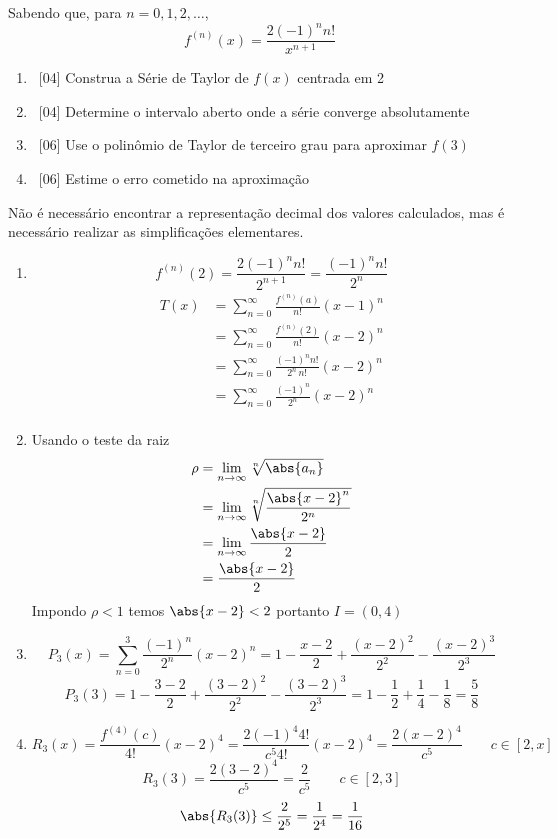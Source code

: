 \documentclass[a4paper,12pt,fleqn]{article}
\begin{document}
Sabendo que, para \(n=0, 1, 2, \dots\),
\[
  f^{(n)}(x) = \frac{2(-1)^n n!}{x^{n+1}}
\]
\begin{enumerate}[label=\alph*)]
  \item\ [04] Construa a Série de Taylor de $f(x)$ centrada em 2
  \item\ [04] Determine o intervalo aberto onde a série converge absolutamente
  \item\ [06] Use o polinômio de Taylor de terceiro grau para aproximar \(f(3)\)
  \item\ [06] Estime o erro cometido na aproximação
\end{enumerate}
Não é necessário encontrar a representação decimal dos valores calculados,
mas é necessário realizar as simplificações elementares.

\begin{answer}
\begin{enumerate}[label=\alph*)]
\item
  \[
    f^{(n)}(2)
    = \frac{2(-1)^n n!}{2^{n+1}}
    = \frac{(-1)^n n!}{2^n}
  \]
  \begin{align*}
    T(x)
    & = \sum_{n=0}^{\infty} \frac{f^{(n)}(a)}{n!}(x-1)^n \\
    & = \sum_{n=0}^{\infty} \frac{f^{(n)}(2)}{n!}(x-2)^n \\
    & = \sum_{n=0}^{\infty} \frac{(-1)^n n!}{2^n\,n!}(x-2)^n \\
    & = \sum_{n=0}^{\infty} \frac{(-1)^n}{2^n}(x-2)^n \\
  \end{align*}

\item
  Usando o teste da raiz
  \begin{align*}
    \rho
    & = \lim_{n\to\infty} \sqrt[n]{\abs{a_n}} \\
    & = \lim_{n\to\infty} \sqrt[n]{\frac{\abs{x-2}^n}{2^n}} \\
    & = \lim_{n\to\infty} \frac{\abs{x-2}}{2} \\
    & = \frac{\abs{x-2}}{2} \\
  \end{align*}
  Impondo \(\rho<1\) temos \(\abs{x-2}<2\) portanto \(I=(0, 4)\)

\item
  \[
    P_3(x)
    = \sum_{n=0}^{3} \frac{(-1)^n}{2^n}(x-2)^n
    = 1 - \frac{x-2}{2} + \frac{(x-2)^2}{2^2} - \frac{(x-2)^3}{2^3}
  \]
  \[
    P_3(3)
    = 1 - \frac{3-2}{2} + \frac{(3-2)^2}{2^2} - \frac{(3-2)^3}{2^3}
    = 1 - \frac{1}{2} + \frac{1}{4} - \frac{1}{8}
    = \frac{5}{8}
  \]

\item
  \[
    R_3(x)
    = \frac{f^{(4)}(c)}{4!}(x-2)^4
    = \frac{2(-1)^4 4!}{c^5 4!}(x-2)^4
    = \frac{2(x-2)^4}{c^5}
    \qquad
    c \in [2, x]
  \]
  \[
    R_3(3)
    = \frac{2(3-2)^4}{c^5}
    = \frac{2}{c^5}
    \qquad
    c \in [2, 3]
  \]
  \[
    \abs{R_3(3)}
    \leq \frac{2}{2^5}
    =    \frac{1}{2^4}
    =    \frac{1}{16}
  \]
\end{enumerate}
\end{answer}

\end{document}
